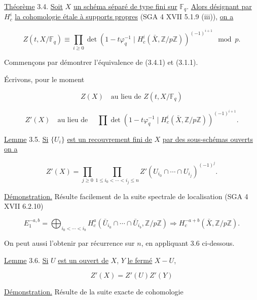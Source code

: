 
\underline{Théorème} 3.4. \underline{Soit} $X$ \underline{un schéma séparé de
type fini sur} $\mathbb F_q$. \underline{Alors désignant par} $H_c^i$ \underline{la cohomologie
étale à supports propres} (SGA 4 XVII 5.1.9 (iii)), \underline{on a}

\begin{equation}\tag{3.4.1}
Z(t,X/\mathbb F_q)
\equiv
\prod_{i\geq0}
\det\!\left(1-t\varphi_q^{-1}\mid
H_c^i(\bar X,\mathbb Z/p\mathbb Z)\right)^{(-1)^{i+1}}
\mod p.
\end{equation}

Commençons par démontrer l'équivalence de (3.4.1) et (3.1.1).

Écrivons, pour le moment

\begin{equation}\tag{3.4.2}
Z(X)\quad\text{au lieu de }Z(t,X/\mathbb F_q)
\end{equation}

\begin{equation}\tag{3.4.3}
Z'(X)\quad\text{au lieu de }\quad
\prod\det\!\left(1-t\varphi_q^{-1}\mid
H_c^i(\bar X,\mathbb Z/p\mathbb Z)\right)^{(-1)^{i+1}}.
\end{equation}

\underline{Lemme} 3.5. \underline{Si} $\{U_i\}$ \underline{est un recouvrement fini de}
$X$ \underline{par des sous-schémas ouverts on a}

\begin{equation}\tag{3.5.1}
Z'(X)=
\prod_{j\geq0}
\prod_{1\leq i_0<\cdots<i_j\leq n}
Z'(U_{i_0}\cap\cdots\cap U_{i_j})^{(-1)^j}.
\end{equation}

\underline{Démonstration.} Résulte facilement de la suite spectrale de
localisation (SGA 4 XVII 6.2.10)

\[
E_1^{-a,b}=\bigoplus_{i_0<\cdots<i_b}
H_c^a(\bar U_{i_0}\cap\cdots\cap\bar U_{i_b},\mathbb Z/p\mathbb Z)
\Longrightarrow H_c^{-a+b}(\bar X,\mathbb Z/p\mathbb Z).
\]

On peut aussi l'obtenir par récurrence sur $n$, en appliquant 3.6 ci-dessous.

\underline{Lemme} 3.6. \underline{Si} $U$ \underline{est un ouvert de} $X$, $Y$ \underline{le fermé}
$X-U$,

\begin{equation}\tag{3.6.1}
Z'(X)=Z'(U)Z'(Y)
\end{equation}

\underline{Démonstration.} Résulte de la suite exacte de cohomologie

